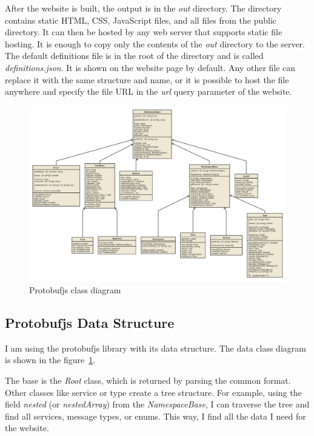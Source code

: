 After the website is built, the output is in the \textit{out} directory.
The directory contains static HTML, CSS, JavaScript files, and all files from the public directory.
It can then be hosted by any web server that supports static file hosting.
It is enough to copy only the contents of the \textit{out} directory to the server.
The default definitions file is in the root of the directory and is called \textit{definitions.json}.
It is shown on the website page by default.
Any other file can replace it with the same structure and name, or it is possible to host the file anywhere and specify the file URL in the \textit{url} query parameter of the website.


\begin{landscape}
    \begin{figure}
        \centering
        \captionsetup{justification=centering}
        \includegraphics[width=0.75\paperheight]{images/implementation/protobufjs-class-diagram}
        \caption{Protobufjs class diagram~\cite{protobufjs}}
        \label{fig:protobufjs-class-diagram}
    \end{figure}
\end{landscape}

\subsection{Protobufjs Data Structure}
I am using the protobufjs library with its data structure.
The data class diagram is shown in the figure~\ref{fig:protobufjs-class-diagram}.

The base is the \textit{Root} class, which is returned by parsing the common format.
Other classes like service or type create a tree structure.
For example, using the field \textit{nested} (or \textit{nestedArray}) from the \textit{NamespaceBase}, I can traverse the tree and find all services, message types, or enums.
This way, I find all the data I need for the website.

